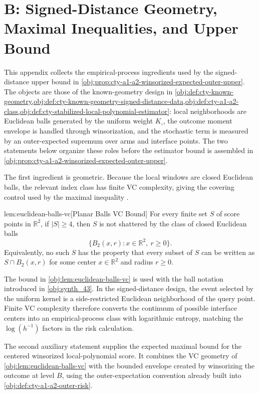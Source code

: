 \section{B: Signed-Distance Geometry, Maximal Inequalities, and Upper Bound}
\label{sec:app-signed-upper}

This appendix collects the empirical-process ingredients used by the signed-distance upper bound in \cref{obj:prop:cty-a1-a2-winsorized-expected-outer-upper}. The objects are those of the known-geometry design in \cref{obj:def:cty-known-geometry,obj:def:cty-known-geometry-signed-distance-data,obj:def:cty-a1-a2-class,obj:def:cty-stabilized-local-polynomial-estimator}: local neighborhoods are Euclidean balls generated by the uniform weight \(K_\square\), the outcome moment envelope is handled through winsorization, and the stochastic term is measured by an outer-expected supremum over arms and interface points. The two statements below organize these roles before the estimator bound is assembled in \cref{obj:prop:cty-a1-a2-winsorized-expected-outer-upper}.

The first ingredient is geometric. Because the local windows are closed Euclidean balls, the relevant index class has finite VC complexity, giving the covering control used by the maximal inequality \citep{Vapnik1971,Pollard1984,VanderVaart1996}.

\begin{lemmav}{lem:euclidean-balls-vc}[Planar Balls VC Bound]
For every finite set \(S\) of score points in \(\mathbb R^2\), if \(|S|\ge 4\), then \(S\) is not shattered by the class of closed Euclidean balls
\[
\{B_2(x,r): x\in\mathbb R^2,\ r\ge 0\}.
\]
Equivalently, no such \(S\) has the property that every subset of \(S\) can be written as \(S\cap B_2(x,r)\) for some center \(x\in\mathbb R^2\) and radius \(r\ge 0\).
\end{lemmav}

The bound in \cref{obj:lem:euclidean-balls-vc} is used with the ball notation introduced in \cref{obj:synth_43}. In the signed-distance design, the event selected by the uniform kernel is a side-restricted Euclidean neighborhood of the query point. Finite VC complexity therefore converts the continuum of possible interface centers into an empirical-process class with logarithmic entropy, matching the \(\log(h^{-1})\) factors in the risk calculation.

The second auxiliary statement supplies the expected maximal bound for the centered winsorized local-polynomial score. It combines the VC geometry of \cref{obj:lem:euclidean-balls-vc} with the bounded envelope created by winsorizing the outcome at level \(B\), using the outer-expectation convention already built into \cref{obj:def:cty-a1-a2-outer-risk}.

